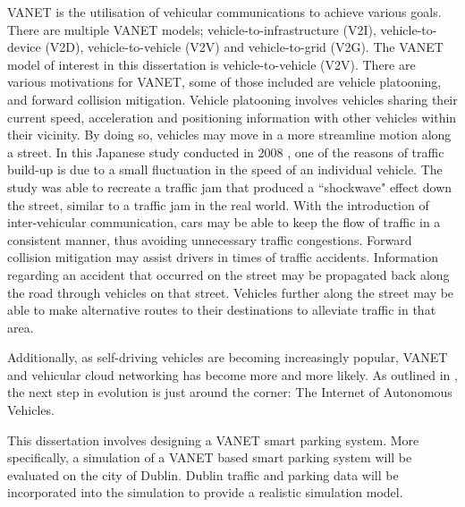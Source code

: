 \ac{VANET} is the utilisation of vehicular communications to achieve various goals. There are multiple \ac{VANET} models; vehicle-to-infrastructure (V2I), vehicle-to-device (V2D), vehicle-to-vehicle (V2V) and vehicle-to-grid (V2G). The \ac{VANET} model of interest in this dissertation is vehicle-to-vehicle (V2V). There are various motivations for \ac{VANET}, some of those included are vehicle platooning, and forward collision mitigation. Vehicle platooning involves vehicles sharing their current speed, acceleration and positioning information with other vehicles within their vicinity. By doing so, vehicles may move in a more streamline motion along a street. In this Japanese study conducted in 2008 \citep{Sugiyamal2008TrafficJam}, one of the reasons of traffic build-up is due to a small fluctuation in the speed of an individual vehicle. The study was able to recreate a traffic jam that produced a ``shockwave" effect down the street, similar to a traffic jam in the real world. With the introduction of inter-vehicular communication, cars may be able to keep the flow of traffic in a consistent manner, thus avoiding unnecessary traffic congestions. Forward collision mitigation may assist drivers in times of traffic accidents. Information regarding an accident that occurred on the street may be propagated back along the road through vehicles on that street. Vehicles further along the street may be able to make alternative routes to their destinations to alleviate traffic in that area.

Additionally, as self-driving vehicles are becoming increasingly popular, \ac{VANET} and vehicular cloud networking has become more and more likely. As outlined in \citep{Gerla2014InternetClouds}, the next step in evolution is just around the corner: The Internet of Autonomous Vehicles.

This dissertation involves designing a \ac{VANET} smart parking system. More specifically, a simulation of a \ac{VANET} based smart parking system will be evaluated on the city of Dublin. Dublin traffic and parking data will be incorporated into the simulation to provide a realistic simulation model.